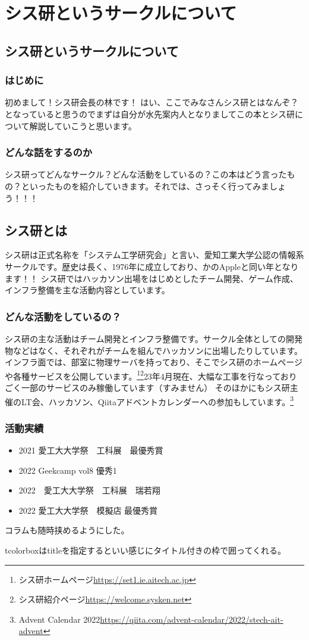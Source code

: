 \chapter{シス研というサークルについて}

\section{シス研というサークルについて}
\subsection{はじめに}
初めまして！シス研会長の林です！
はい、ここでみなさんシス研とはなんぞ？となっていると思うのでまずは自分が水先案内人となりましてこの本とシス研について解説していこうと思います。

\subsection{どんな話をするのか}
シス研ってどんなサークル？どんな活動をしているの？この本はどう言ったもの？といったものを紹介していきます。それでは、さっそく行ってみましょう！！！

\section{シス研とは}
シス研は正式名称を「システム工学研究会」と言い、愛知工業大学公認の情報系サークルです。歴史は長く、1976年に成立しており、かのAppleと同い年となります！！
シス研ではハッカソン出場をはじめとしたチーム開発、ゲーム作成、インフラ整備を主な活動内容としています。

\subsection{どんな活動をしているの？}
シス研の主な活動はチーム開発とインフラ整備です。サークル全体としての開発物などはなく、それぞれがチームを組んでハッカソンに出場したりしています。
インフラ面では、部室に物理サーバを持っており、そこでシス研のホームページや各種サービスを公開しています。\footnote{シス研ホームページ\url{https://set1.ie.aitech.ac.jp}}\footnote{シス研紹介ページ\url{https://welcome.sysken.net}}23年4月現在、大幅な工事を行なっておりごく一部のサービスのみ稼働しています（すみません）
そのほかにもシス研主催のLT会、ハッカソン、Qiitaアドベントカレンダーへの参加もしています。\footnote{Advent Calendar 2022\url{https://qiita.com/advent-calendar/2022/stech-ait-advent}}

\subsection{活動実績}
\begin{itemize}
  \item 2021 愛工大大学祭　工科展　最優秀賞
  \item 2022 Geekcamp vol8 優秀1
  \item 2022　愛工大大学祭　工科展　瑞若翔
  \item 2022 愛工大大学祭　模擬店 最優秀賞
\end{itemize}

\begin{tcolorbox}[title=シス研の設備]
  コラムも随時挟めるようにした。

  tcolorboxはtitleを指定するといい感じにタイトル付きの枠で囲ってくれる。
\end{tcolorbox}